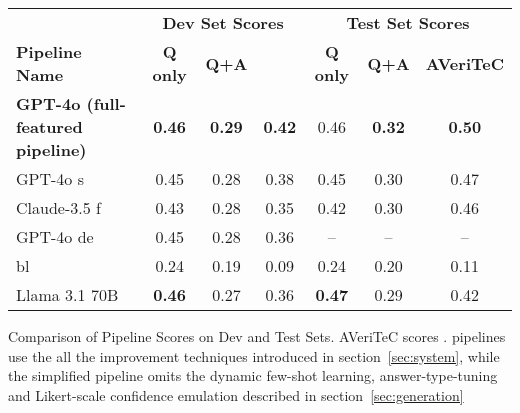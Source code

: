    \centering
    \begin{tabular}{l | c c c | c c c}
    \hline
    &\multicolumn{3}{c|}{\textbf{Dev Set Scores}} & \multicolumn{3}{c}{\textbf{Test Set Scores}}  \\
    \textbf{Pipeline Name} & \textbf{Q only} & \textbf{Q+A} & \textbf{\averitec{}} & \textbf{Q only} & \textbf{Q+A} & \textbf{AVeriTeC} \\ \hline
    \textbf{GPT-4o (full-featured pipeline)}      & \textbf{0.46} & \textbf{0.29} & \textbf{0.42} & 0.46 & \textbf{0.32} & \textbf{0.50}\\
    GPT-4o s         & 0.45 & 0.28 & 0.38 & 0.45 & 0.30 & 0.47 \\
    Claude-3.5 f             & 0.43 & 0.28 & 0.35 & 0.42 & 0.30 & 0.46 \\
    GPT-4o de              & 0.45 & 0.28 & 0.36 & -- & -- & --\\
    \averitec{} bl            & 0.24 & 0.19 & 0.09 & 0.24 & 0.20 & 0.11\\
    \hline
    Llama 3.1 70B & \textbf{0.46} & 0.27 & 0.36 & \textbf{0.47} & 0.29 & 0.42\\
    \bottomrule
    \end{tabular}
    \caption{Comparison of Pipeline Scores on Dev and Test Sets.  AVeriTeC scores .  pipelines use the all the improvement techniques introduced in section~\ref{sec:system}, while the simplified pipeline omits the dynamic few-shot learning, answer-type-tuning and Likert-scale confidence emulation described in section~\ref{sec:generation}}
    \label{tab:pipeline_scores}